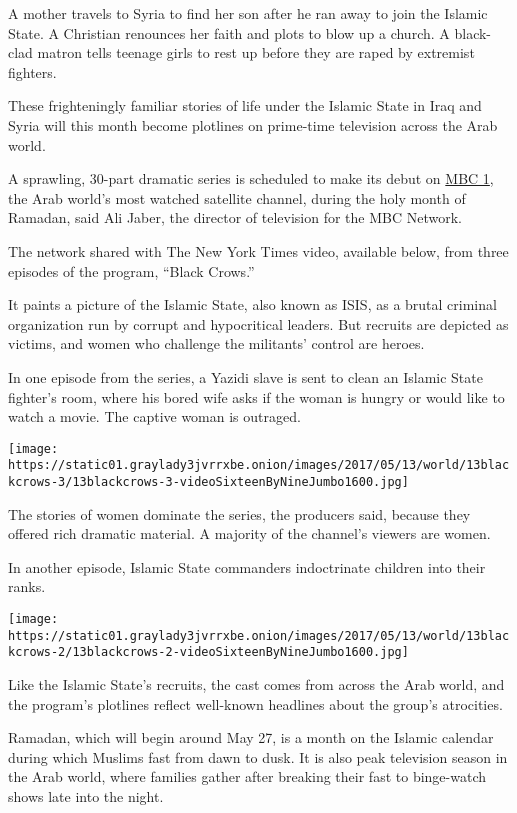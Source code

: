 A mother travels to Syria to find her son after he ran away to join the
Islamic State. A Christian renounces her faith and plots to blow up a
church. A black-clad matron tells teenage girls to rest up before they
are raped by extremist fighters.

These frighteningly familiar stories of life under the Islamic State in
Iraq and Syria will this month become plotlines on prime-time television
across the Arab world.

A sprawling, 30-part dramatic series is scheduled to make its debut on
\href{http://www.mbc.net/en/corporate/channels/mbc1.html}{MBC 1}, the
Arab world's most watched satellite channel, during the holy month of
Ramadan, said Ali Jaber, the director of television for the MBC Network.

The network shared with The New York Times video, available below, from
three episodes of the program, ``Black Crows.''

It paints a picture of the Islamic State, also known as ISIS, as a
brutal criminal organization run by corrupt and hypocritical leaders.
But recruits are depicted as victims, and women who challenge the
militants' control are heroes.

In one episode from the series, a Yazidi slave is sent to clean an
Islamic State fighter's room, where his bored wife asks if the woman is
hungry or would like to watch a movie. The captive woman is outraged.

\texttt{[image: https://static01.graylady3jvrrxbe.onion/images/2017/05/13/world/13blackcrows-3/13blackcrows-3-videoSixteenByNineJumbo1600.jpg]}

The stories of women dominate the series, the producers said, because
they offered rich dramatic material. A majority of the channel's viewers
are women.

In another episode, Islamic State commanders indoctrinate children into
their ranks.

\texttt{[image: https://static01.graylady3jvrrxbe.onion/images/2017/05/13/world/13blackcrows-2/13blackcrows-2-videoSixteenByNineJumbo1600.jpg]}

Like the Islamic State's recruits, the cast comes from across the Arab
world, and the program's plotlines reflect well-known headlines about
the group's atrocities.

Ramadan, which will begin around May 27, is a month on the Islamic
calendar during which Muslims fast from dawn to dusk. It is also peak
television season in the Arab world, where families gather after
breaking their fast to binge-watch shows late into the night.

